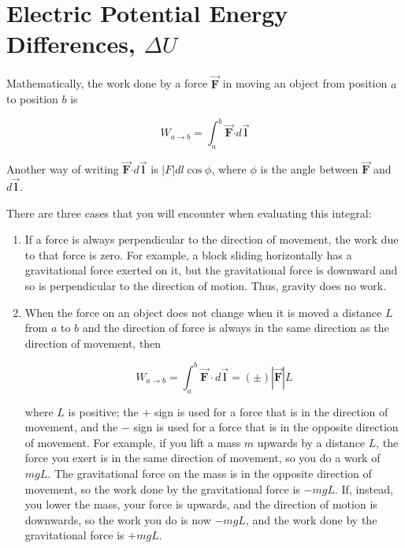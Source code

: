 \documentclass{article}
\newcommand{\bfvec}[1]{\vec{\mathbf{#1}}}
\newcommand{\bfcdot}[0]{\boldsymbol{\cdot}}
\begin{document}
\section{Electric Potential Energy Differences, $\Delta U$}


Mathematically, the work done by a force $\bfvec{F}$ in moving an object from position $a$ to position $b$ is

$$
W_{a\rightarrow b}=\int_a^b \bfvec{F}\bfcdot d\bfvec{l}
$$

Another way of writing $\bfvec{F}\bfcdot d\bfvec{l}$ is $|F|dl\cos\phi$, where $\phi$ is the angle between $\bfvec{F}$ and $d{\bfvec l}$.

There are three cases that you will encounter when evaluating this integral:

\begin{enumerate}

  \item If a force is always perpendicular to the direction of movement, the work due to that force is zero. For example, a block sliding horizontally has a gravitational force exerted on it, but the gravitational force is downward and so is perpendicular to the direction of motion. Thus, gravity does no work.

  \item When the force on an object does not change when it is moved a distance $L$ from $a$ to $b$ and the direction of force is always in the same direction as the direction of movement, then

        $$W_{a\rightarrow b}=\int_a^b \bfvec{F}\cdot d\bfvec{l}=(\pm)|\bfvec{F}|L$$

        where $L$ is positive; the $+$ sign is used for a force that is in the direction of movement, and the $-$ sign is used for a force that is in the opposite direction of movement. For example, if you lift a mass $m$ upwards by a distance $L$, the force you exert is in the same direction of movement, so you do a work of $mgL$. The gravitational force on the mass is in the opposite direction of movement, so the work done by the gravitational force is $-mgL$. If, instead, you lower the mass, your force is upwards, and the direction of motion is downwards, so the work you do is now $-mgL$, and the work done by the gravitational force is $+mgL$.

\end{enumerate}
\end{document}
